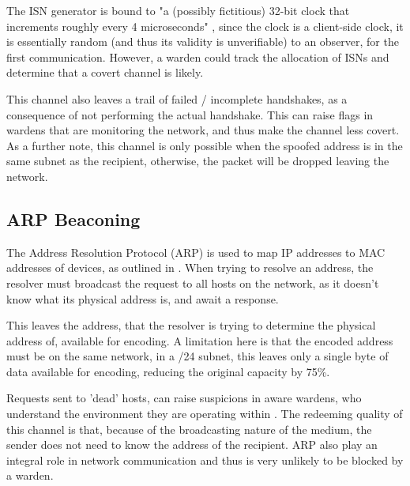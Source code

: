 The ISN generator is bound to "a (possibly fictitious) 32-bit clock that increments roughly every 4 microseconds" \citep{Trfc793}, since the clock is a client-side clock, it is essentially random (and thus its validity is unverifiable) to an observer, for the first communication. However, a warden could track the allocation of ISNs and determine that a covert channel is likely.

This channel also leaves a trail of failed / incomplete handshakes, as a consequence of not performing the actual handshake. This can raise flags in wardens that are monitoring the network, and thus make the channel less covert. As a further note, this channel is only possible when the spoofed address is in the same subnet as the recipient, otherwise, the packet will be dropped leaving the network. 

\subsection{ARP Beaconing}
\label{sec:ARP}

The Address Resolution Protocol (ARP) is used to map IP addresses to MAC addresses of devices, as outlined in \cite{Arfc826}. When trying to resolve an address, the resolver must broadcast the request to all hosts on the network, as it doesn't know what its physical address is, and await a response.

This leaves the address, that the resolver is trying to determine the physical address of, available for encoding. A limitation here is that the encoded address must be on the same network, in a /24 subnet, this leaves only a single byte of data available for encoding, reducing the original capacity by 75\%.

Requests sent to 'dead' hosts, can raise suspicions in aware wardens, who understand the environment they are operating within \citep{CCUARP}. The redeeming quality of this channel is that, because of the broadcasting nature of the medium, the sender does not need to know the address of the recipient. ARP also play an integral role in network communication and thus is very unlikely to be blocked by a warden.
